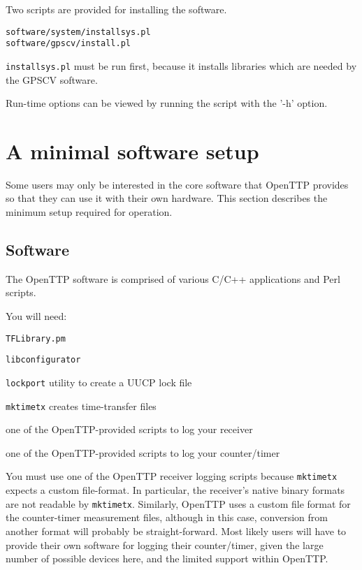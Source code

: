 \documentclass[11pt,a4paper,openany,oneside]{book}
\newcommand{\cc}[1]{{\small\texttt{#1}}}
\newenvironment{description*}%
  {\setlength{\parskip}{0pt}%
	 \begin{description}%
		\setlength{\topsep}{-12pt}%
		\setlength{\itemindent}{-12pt}%
    \setlength{\itemsep}{0pt}%
		\setlength{\itemsep}{0pt}}%
  {\end{description}}
\begin{document}
Two scripts are provided for installing the software.
\begin{lstlisting}
software/system/installsys.pl
software/gpscv/install.pl
\end{lstlisting}

\cc{installsys.pl} must be run first, because it installs  libraries which are needed by the GPSCV software.

Run-time options can be viewed by running the script with the '-h' option.

\section{A minimal software setup}

Some users may only be interested in the core software that OpenTTP provides so that they can use
it with their own hardware. This section describes the minimum setup required for operation.

\subsection{Software}

The OpenTTP software is comprised of various C/C++ applications and Perl scripts.

You will need:
\begin{description*}
	\item \cc{TFLibrary.pm}
	\item \cc{libconfigurator}
	\item \cc{lockport} utility to create a UUCP lock file
	\item \cc{mktimetx} creates time-transfer files
	\item one of the OpenTTP-provided scripts to log your receiver
	\item one of the OpenTTP-provided scripts to log your counter/timer
\end{description*}

You must use one of the OpenTTP receiver logging scripts because \cc{mktimetx} expects a custom file-format. In particular, the
receiver's native binary formats are not readable by \cc{mktimetx}. Similarly, OpenTTP uses a custom file
format for the counter-timer measurement files, although in this case, conversion from another format
will probably be straight-forward. Most likely users will have to provide their own software for
logging their counter/timer, given the large number of possible devices here, and the limited
support within OpenTTP.
\end{document}
